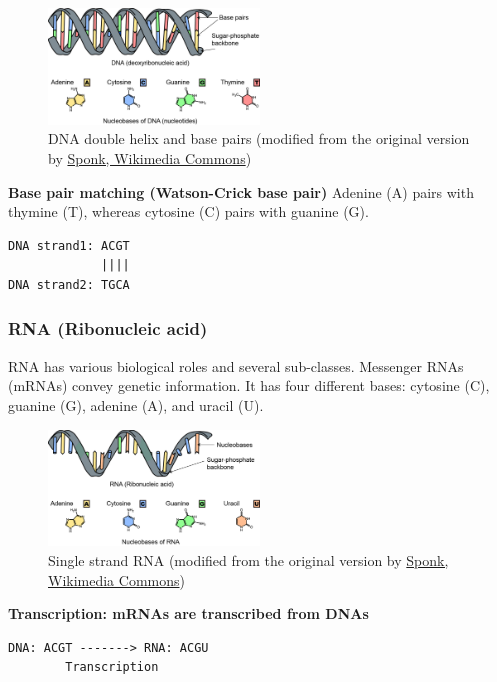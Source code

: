 \begin{figure}[H]
  \centering
      \includegraphics[width=0.5\textwidth]{fig01/dna_bases.png}
  \caption{DNA double helix and base pairs (modified from the original version by \href{https://commons.wikimedia.org/w/index.php?curid=9810855}{Sponk, Wikimedia Commons})}
\end{figure}

\noindent \textbf{Base pair matching (Watson-Crick base pair)}
Adenine (A) pairs with thymine (T), whereas cytosine (C) pairs with guanine (G).

\noindent \begin{verbatim}
DNA strand1: ACGT
             ||||
DNA strand2: TGCA
\end{verbatim}
	
%
%
\subsubsection*{RNA (Ribonucleic acid)}
RNA has various biological roles and several sub-classes. Messenger RNAs (mRNAs) convey genetic information.  It has four different bases: cytosine (C), guanine (G), adenine (A), and uracil (U).

\begin{figure}[H]
  \centering
      \includegraphics[width=0.5\textwidth]{fig01/rna_bases.png}
  \caption{Single strand RNA (modified from the original version by \href{https://commons.wikimedia.org/w/index.php?curid=9810855}{Sponk, Wikimedia Commons})}
\end{figure}

\noindent \textbf{Transcription: mRNAs are transcribed from DNAs}

\begin{verbatim}
DNA: ACGT -------> RNA: ACGU
        Transcription
\end{verbatim}

